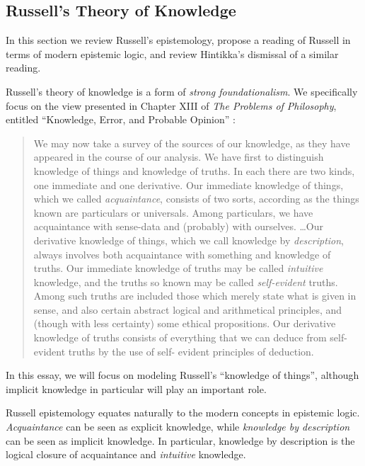 \subsection{Russell's Theory of Knowledge}\label{Russell}

In this section we review Russell's epistemology, propose a reading of
Russell in
terms of modern epistemic logic, and review Hintikka's dismissal of a similar reading.

Russell's theory of knowledge is a form of \emph{strong
  foundationalism}.  We specifically focus on the view presented in
Chapter XIII of \emph{The Problems of Philosophy}, entitled
``Knowledge, Error, and Probable Opinion'' \cite[pg. 52]{russell_problems_1936}:
\begin{quote}
We may now take a survey of the sources of our knowledge, as they have
appeared in the course of our analysis. We have first to distinguish knowledge
of things and knowledge of truths. In each there are two kinds, one immediate
and one derivative. Our immediate knowledge of things, which we called
\emph{acquaintance}, consists of two sorts, according as the things known are
particulars or universals. Among particulars, we have acquaintance with
sense-data and (probably) with ourselves.%
\ldots Our derivative knowledge of things, which we call knowledge by \emph{description},
always involves both acquaintance with something and knowledge of truths.
Our immediate knowledge of truths may be called \emph{intuitive} knowledge, and the
truths so known may be called \emph{self-evident} truths. Among such truths are
included those which merely state what is given in sense, and also certain
abstract logical and arithmetical principles, and (though with less certainty)
some ethical propositions. Our derivative knowledge of truths consists of
everything that we can deduce from self-evident truths by the use of self-
evident principles of deduction.
\end{quote}

  In this essay, we will focus on modeling Russell's ``knowledge of things'',
  although implicit knowledge in particular will play an important
  role.

  Russell epistemology equates naturally to the modern concepts in
  epistemic logic. 
  \emph{Acquaintance} can be seen as explicit knowledge, while
  \emph{knowledge by description} can be seen as implicit knowledge.
  In particular, knowledge by description is the logical closure of
  acquaintance and \emph{intuitive} knowledge.

